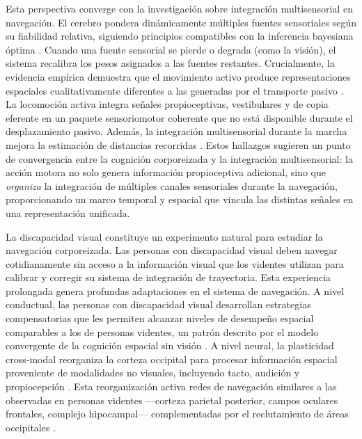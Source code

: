 \documentclass[12pt,letterpaper]{article}
\begin{document}
Esta perspectiva converge con la investigación sobre integración multisensorial en navegación. El cerebro pondera dinámicamente múltiples fuentes sensoriales según su fiabilidad relativa, siguiendo principios compatibles con la inferencia bayesiana óptima \parencite{Loomis2012,Zhou2022}. Cuando una fuente sensorial se pierde o degrada (como la visión), el sistema recalibra los pesos asignados a las fuentes restantes. Crucialmente, la evidencia empírica demuestra que el movimiento activo produce representaciones espaciales cualitativamente diferentes a las generadas por el transporte pasivo \parencite{Chance1998,Waller2004}. La locomoción activa integra señales propioceptivas, vestibulares y de copia eferente en un paquete sensoriomotor coherente que no está disponible durante el desplazamiento pasivo. Además, la integración multisensorial durante la marcha mejora la estimación de distancias recorridas \parencite{Campos2012}. Estos hallazgos sugieren un punto de convergencia entre la cognición corporeizada y la integración multisensorial: la acción motora no solo genera información propioceptiva adicional, sino que \textit{organiza} la integración de múltiples canales sensoriales durante la navegación, proporcionando un marco temporal y espacial que vincula las distintas señales en una representación unificada.

La discapacidad visual constituye un experimento natural para estudiar la navegación corporeizada. Las personas con discapacidad visual deben navegar cotidianamente sin acceso a la información visual que los videntes utilizan para calibrar y corregir su sistema de integración de trayectoria. Esta experiencia prolongada genera profundas adaptaciones en el sistema de navegación. A nivel conductual, las personas con discapacidad visual desarrollan estrategias compensatorias que les permiten alcanzar niveles de desempeño espacial comparables a los de personas videntes, un patrón descrito por el modelo convergente de la cognición espacial sin visión \parencite{Giudice2018}. A nivel neural, la plasticidad cross-modal reorganiza la corteza occipital para procesar información espacial proveniente de modalidades no visuales, incluyendo tacto, audición y propiocepción \parencite{Bleau2022meta,Chebat2020,Mowad2020}. Esta reorganización activa redes de navegación similares a las observadas en personas videntes ---corteza parietal posterior, campos oculares frontales, complejo hipocampal--- complementadas por el reclutamiento de áreas occipitales \parencite{Bleau2022meta}.
\end{document}
